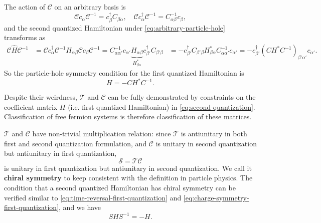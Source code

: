 \documentclass[hyperref, a4paper]{article}
\newcommand*{\concept}[1]{{\textbf{#1}}}
\def\\{}%
\begin{document}
The action of $\mathcal{C}$ on an arbitrary basis is 
\begin{equation}
    \mathcal{C} c_{\alpha} \mathcal{C}^{-1} = c_\beta^\dagger C_{\beta \alpha}, \quad 
    \mathcal{C} c^\dagger_{\alpha} \mathcal{C}^{-1} = C^{-1}_{\alpha \beta} c_\beta,
    \label{eq:arbitrary-particle-hole}
\end{equation}
and the second quantized Hamiltonian under \eqref{eq:arbitrary-particle-hole} transforms as 
\begin{equation}
    \begin{aligned}
        \mathcal{C} \hat{H} \mathcal{C}^{-1} &= \mathcal{C} c_\alpha^\dagger \mathcal{C}^{-1} H_{\alpha \beta} \mathcal{C} c_\beta \mathcal{C}^{-1} = C^{-1}_{\alpha \alpha'} c_{\alpha'} \underbrace{H_{\alpha \beta}}_{H_{\beta \alpha}^*} c^\dagger_{\beta'} C_{\beta' \beta} \\
        &= - c^\dagger_{\beta'} C_{\beta' \beta} H^*_{\beta \alpha} C^{-1}_{\alpha \alpha'} c_{\alpha'} = - c^\dagger_{\beta'} (CH^* C^{-1})_{\beta' \alpha'} c_{\alpha'}.
    \end{aligned}
\end{equation}
So the particle-hole symmetry condition for the first quantized Hamiltonian is 
\begin{equation}
    H = - C H^* C^{-1}.
    \label{eq:charge-symmetry-first-quantization}
\end{equation}

Despite their weirdness, $\mathcal{T}$ and $\mathcal{C}$ can be fully demonstrated by constraints on 
the coefficient matrix $H$ (i.e. first quantized Hamiltonian) in \eqref{eq:second-quantization}.
Classification of free fermion systems is therefore classification of these matrices. 

$\mathcal{T}$ and $\mathcal{C}$ have non-trivial multiplication relation: since $\mathcal{T}$ is antiunitary
in both first and second quantization formulation, and $\mathcal{C}$ is unitary in second quantization but 
antiunitary in first quantization, 
\begin{equation}
    \mathcal{S} = \mathcal{T} \mathcal{C}
\end{equation} 
is unitary in first quantization but antiunitary in second quantization. We call it \concept{chiral symmetry}
to keep consistent with the definition in particle physics.
The condition that a second quantized Hamiltonian has chiral symmetry can be verified similar to \eqref{eq:time-reversal-first-quantization} and \eqref{eq:charge-symmetry-first-quantization}, and we have 
\begin{equation}
    S H S^{-1} =  - H.
    \label{eq:chiral-first-quantization}
\end{equation}
\end{document}
